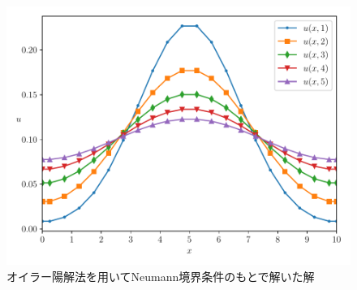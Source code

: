 \documentclass[a4j, titlepage]{jsarticle}
\numberwithin{equation}{section}
\begin{document}
            \begin{figure}[h]
                \centering
                \includegraphics[width=0.8\hsize]{kadai1/2.pdf}
                \caption{オイラー陽解法を用いてNeumann境界条件のもとで解いた解}
                \label{fig:euler_neumann}
            \end{figure}
\end{document}
